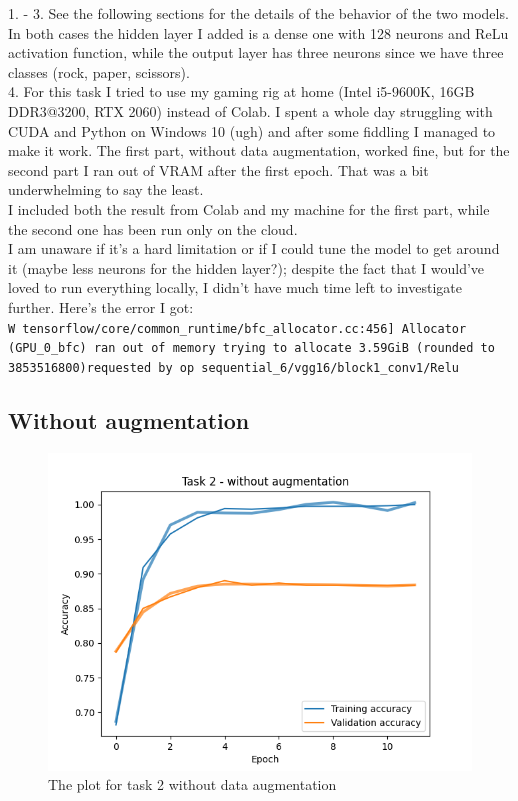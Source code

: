\documentclass[11pt]{scrartcl}
\begin{document}
	1. - 3. See the following sections for the details of the behavior of the two models. In both cases the hidden layer I added is a dense one with 128 neurons and ReLu activation function, while the output layer has three neurons since we have three classes (rock, paper, scissors).\\

	4. For this task I tried to use my gaming rig at home (Intel i5-9600K, 16GB DDR3@3200, RTX 2060) instead of Colab. I spent a whole day struggling with CUDA and Python on Windows 10 (ugh) and after some fiddling I managed to make it work. The first part, without data augmentation, worked fine, but for the second part I ran out of VRAM after the first epoch. That was a bit underwhelming to say the least.\\
	I included both the result from Colab and my machine for the first part, while the second one has been run only on the cloud.\\

	I am unaware if it's a hard limitation or if I could tune the model to get around it (maybe less neurons for the hidden layer?); despite the fact that I would've loved to run everything locally, I didn't have much time left to investigate further. Here's the error I got:\\
	\texttt{W tensorflow/core/common\_runtime/bfc\_allocator.cc:456] Allocator (GPU\_0\_bfc) ran
	out of memory trying to allocate 3.59GiB (rounded to 3853516800)requested by op
	sequential\_6/vgg16/block1\_conv1/Relu}


	\subsection*{Without augmentation}

		\begin{figure}[H]
			\centering
			\includegraphics[width=\textwidth]{src/plot_task2_no_augmentation.png}
			\caption{The plot for task 2 without data augmentation}
			\label{fig:plot_T2_1}
		\end{figure}
\end{document}

